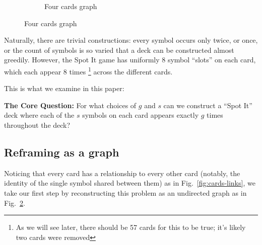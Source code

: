 \documentclass[11pt, oneside]{article} 	%
\begin{document}
\begin{figure}[!htb]
\begin{subfigure}{.2\textwidth}
\centering
{}
\caption{Four cards graph}
\label{fig:cards-graph}
\end{subfigure}

\end{figure}

Naturally, there are trivial constructions: every symbol occurs only twice, or once, or the count of symbols is so varied that a deck can be constructed almost greedily.  However, the Spot It game has uniformly 8 symbol ``slots'' on each card, which each appear 8 times \footnote{As we will see later, there should be 57 cards for this to be true; it's likely two cards were removed} across the different cards.  

This is what we examine in this paper:

\begin{framed}
\textbf{The Core Question:} For what choices of $g$ and $s$ can we construct a ``Spot It'' deck where each of the $s$ symbols on each card appears exactly $g$ times throughout the deck?
\end{framed}

\subsection{Reframing as a graph}
Noticing that every card has a relationship to every other card (notably, the identity of the single symbol shared between them) as in Fig.~\ref{fig:cards-links}, we take our first step by reconstructing this problem as an undirected graph as in Fig.~\ref{fig:cards-graph}. 
\end{document}
